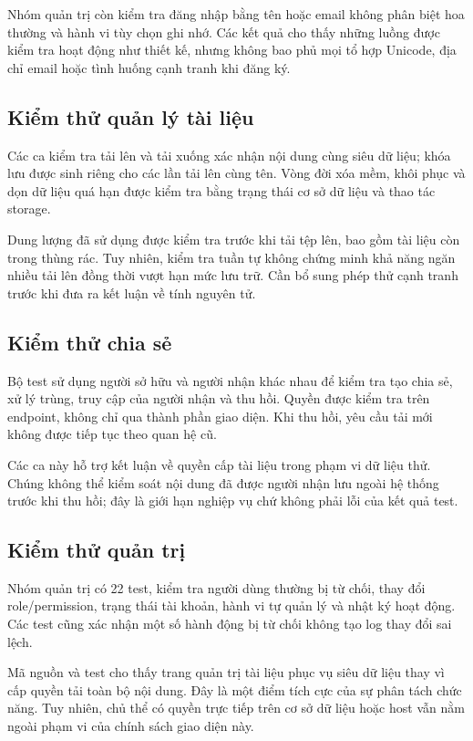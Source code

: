 Nhóm quản trị còn kiểm tra đăng nhập bằng tên hoặc email không phân biệt hoa thường và hành vi tùy chọn ghi nhớ. Các kết quả cho thấy những luồng được kiểm tra hoạt động như thiết kế, nhưng không bao phủ mọi tổ hợp Unicode, địa chỉ email hoặc tình huống cạnh tranh khi đăng ký.
\subsection{Kiểm thử quản lý tài liệu}
Các ca kiểm tra tải lên và tải xuống xác nhận nội dung cùng siêu dữ liệu; khóa lưu được sinh riêng cho các lần tải lên cùng tên. Vòng đời xóa mềm, khôi phục và dọn dữ liệu quá hạn được kiểm tra bằng trạng thái cơ sở dữ liệu và thao tác storage.

Dung lượng đã sử dụng được kiểm tra trước khi tải tệp lên, bao gồm tài liệu còn trong thùng rác. Tuy nhiên, kiểm tra tuần tự không chứng minh khả năng ngăn nhiều tải lên đồng thời vượt hạn mức lưu trữ. Cần bổ sung phép thử cạnh tranh trước khi đưa ra kết luận về tính nguyên tử.
\subsection{Kiểm thử chia sẻ}
Bộ test sử dụng người sở hữu và người nhận khác nhau để kiểm tra tạo chia sẻ, xử lý trùng, truy cập của người nhận và thu hồi. Quyền được kiểm tra trên endpoint, không chỉ qua thành phần giao diện. Khi thu hồi, yêu cầu tải mới không được tiếp tục theo quan hệ cũ.

Các ca này hỗ trợ kết luận về quyền cấp tài liệu trong phạm vi dữ liệu thử. Chúng không thể kiểm soát nội dung đã được người nhận lưu ngoài hệ thống trước khi thu hồi; đây là giới hạn nghiệp vụ chứ không phải lỗi của kết quả test.
\subsection{Kiểm thử quản trị}
Nhóm quản trị có 22 test, kiểm tra người dùng thường bị từ chối, thay đổi role/permission, trạng thái tài khoản, hành vi tự quản lý và nhật ký hoạt động. Các test cũng xác nhận một số hành động bị từ chối không tạo log thay đổi sai lệch.

Mã nguồn và test cho thấy trang quản trị tài liệu phục vụ siêu dữ liệu thay vì cấp quyền tải toàn bộ nội dung. Đây là một điểm tích cực của sự phân tách chức năng. Tuy nhiên, chủ thể có quyền trực tiếp trên cơ sở dữ liệu hoặc host vẫn nằm ngoài phạm vi của chính sách giao diện này.

